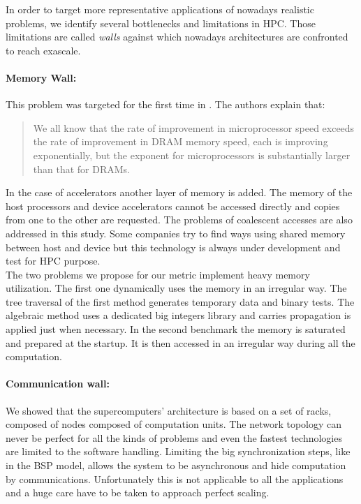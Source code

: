 In order to target more representative applications of nowadays realistic problems, we identify several bottlenecks and limitations in HPC. 
Those limitations are called \textit{walls} against which nowadays architectures are confronted to reach exascale. 

\paragraph{Memory Wall: }
This problem was targeted for the first time in \cite{wulf1995hitting}.
The authors explain that:
\begin{quotation} We all know that the rate of improvement in microprocessor speed exceeds the rate of improvement in DRAM memory speed, each is improving exponentially, but the exponent for microprocessors is substantially larger than that for DRAMs.
\end{quotation}
In the case of accelerators another layer of memory is added. 
The memory of the host processors and device accelerators cannot be accessed directly and copies from one to the other are requested.
The problems of coalescent accesses are also addressed in this study.
Some companies try to find ways using shared memory between host and device but this technology is always under development and test for HPC purpose. \\

The two problems we propose for our metric implement heavy memory utilization. 
The first one dynamically uses the memory in an irregular way. 
The tree traversal of the first method generates temporary data and binary tests. 
The algebraic method uses a dedicated big integers library and carries propagation is applied just when necessary. 
In the second benchmark the memory is saturated and prepared at the startup.
It is then accessed in an irregular way during all the computation. 

\paragraph{Communication wall: } 
We showed that the supercomputers' architecture is based on a set of racks, composed of nodes composed of computation units. 
The network topology can never be perfect for all the kinds of problems and even the fastest technologies are limited to the software handling. 
Limiting the big synchronization steps, like in the BSP model, allows the system to be asynchronous and hide computation by communications. 
Unfortunately this is not applicable to all the applications and a huge care have to be taken to approach perfect scaling.\\

